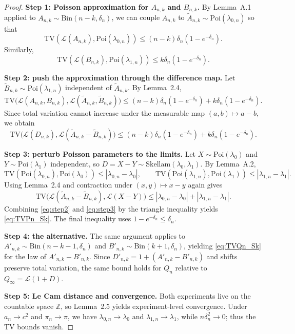 \documentclass{article}
\begin{document}
\begin{proof}
\textbf{Step 1: Poisson approximation for $A_{n,k}$ and $B_{n,k}$.} By Lemma~A.1 applied to $A_{n,k} \sim \mathrm{Bin}(n-k, \delta_n)$, we can couple $A_{n,k}$ to $\tilde{A}_{n,k} \sim \mathrm{Poi}(\lambda_{0,n})$ so that
\[
\mathrm{TV}(\mathcal{L}(A_{n,k}), \mathrm{Poi}(\lambda_{0,n})) \leq (n-k)\delta_n(1-e^{-\delta_n}).
\]
Similarly,
\[
\mathrm{TV}(\mathcal{L}(B_{n,k}), \mathrm{Poi}(\lambda_{1,n})) \leq k\delta_n(1-e^{-\delta_n}).
\]

\textbf{Step 2: push the approximation through the difference map.} Let $\tilde{B}_{n,k} \sim \mathrm{Poi}(\lambda_{1,n})$
independent of $\tilde{A}_{n,k}$. By Lemma~2.4,
\[
\mathrm{TV}\bigl(\mathcal{L}(A_{n,k}, B_{n,k}), \mathcal{L}(\tilde{A}_{n,k}, \tilde{B}_{n,k})\bigr) \leq (n-k)\delta_n(1-e^{-\delta_n}) + k\delta_n(1-e^{-\delta_n}).
\]
Since total variation cannot increase under the measurable map $(a,b) \mapsto a - b$, we obtain
\begin{equation}
\mathrm{TV}\bigl(\mathcal{L}(D_{n,k}), \mathcal{L}(\tilde{A}_{n,k} - \tilde{B}_{n,k})\bigr) \leq (n-k)\delta_n(1-e^{-\delta_n}) + k\delta_n(1-e^{-\delta_n}). \label{eq:step2}
\end{equation}

\textbf{Step 3: perturb Poisson parameters to the limits.} Let $X \sim \mathrm{Poi}(\lambda_0)$ and $Y \sim \mathrm{Poi}(\lambda_1)$
independent, so $D = X - Y \sim \mathrm{Skellam}(\lambda_0, \lambda_1)$. By Lemma~A.2,
\[
\mathrm{TV}(\mathrm{Poi}(\lambda_{0,n}), \mathrm{Poi}(\lambda_0)) \leq |\lambda_{0,n} - \lambda_0|, \qquad \mathrm{TV}(\mathrm{Poi}(\lambda_{1,n}), \mathrm{Poi}(\lambda_1)) \leq |\lambda_{1,n} - \lambda_1|.
\]
Using Lemma~2.4 and contraction under $(x,y) \mapsto x - y$ again gives
\begin{equation}
\mathrm{TV}\bigl(\mathcal{L}(\tilde{A}_{n,k} - \tilde{B}_{n,k}), \mathcal{L}(X - Y)\bigr) \leq |\lambda_{0,n} - \lambda_0| + |\lambda_{1,n} - \lambda_1|. \label{eq:step3}
\end{equation}
Combining \eqref{eq:step2} and \eqref{eq:step3} by the triangle inequality yields \eqref{eq:TVPn_Sk}. The final inequality uses $1 - e^{-\delta_n} \leq \delta_n$.

\textbf{Step 4: the alternative.} The same argument applies to $A'_{n,k} \sim \mathrm{Bin}(n-k-1, \delta_n)$ and
$B'_{n,k} \sim \mathrm{Bin}(k+1, \delta_n)$, yielding \eqref{eq:TVQn_Sk} for the law of $A'_{n,k} - B'_{n,k}$. Since $D'_{n,k} = 1 + (A'_{n,k} - B'_{n,k})$ and
shifts preserve total variation, the same bound holds for $Q_n$ relative to $Q_\infty = \mathcal{L}(1 + D)$.

\textbf{Step 5: Le Cam distance and convergence.} Both experiments live on the countable space $\mathbb{Z}$,
so Lemma~2.5 yields experiment-level convergence. Under $a_n \to c^2$ and $\pi_n \to \pi$, we have $\lambda_{0,n} \to \lambda_0$
and $\lambda_{1,n} \to \lambda_1$, while $n\delta_n^2 \to 0$; thus the TV bounds vanish.
\end{proof}
\end{document}

